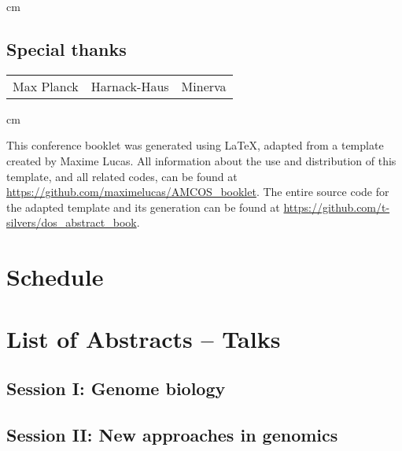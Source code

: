 \documentclass[10pt,a4paper]{scrreprt}
\begin{document}
 cm

\section*{Special thanks}
	\begin{tabular}{l l l}
		Max Planck & Harnack-Haus & Minerva
	\end{tabular}

 cm

\noindent
{\small This conference booklet was generated using \LaTeX{}, adapted from a template created by Maxime Lucas. All information about the use and distribution of this template, and all related codes, can be found at \url{https://github.com/maximelucas/AMCOS_booklet}. The entire source code for the adapted template and its generation can be found at \url{https://github.com/t-silvers/dos_abstract_book}.}


\chapter{Schedule}



\chapter{List of Abstracts -- Talks}



\section{Session I: Genome biology}

\section{Session II: New approaches in genomics}
\end{document}
